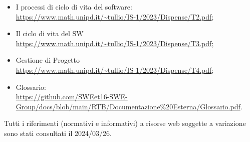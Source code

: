 \begin{itemize}
\item I processi di ciclo di vita del software: \\ \url{https://www.math.unipd.it/~tullio/IS-1/2023/Dispense/T2.pdf};
\item Il ciclo di vita del SW\\ \url{https://www.math.unipd.it/~tullio/IS-1/2023/Dispense/T3.pdf};
\item Gestione di Progetto\\ \url{https://www.math.unipd.it/~tullio/IS-1/2023/Dispense/T4.pdf};
\item Glossario: \\ \url{https://github.com/SWEet16-SWE-Group/docs/blob/main/RTB/Documentazione%20Esterna/Glossario.pdf}.
\end{itemize}

        Tutti i riferimenti (normativi e informativi) a risorse web soggette a variazione sono stati consultati il 2024/03/26.

